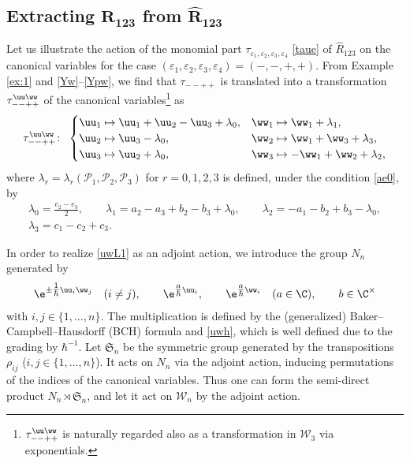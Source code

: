 \subsection[Extracting R\_123 from R\_123]{Extracting $\boldsymbol{R_{123}}$ from $\boldsymbol{\widehat{R}_{123}}$}

Let us illustrate the action of the monomial part
$\tau_{\varepsilon_1, \varepsilon_2, \varepsilon_3, \varepsilon_4}$
 \eqref{taue} of $\widehat{R}_{123}$ on the canonical variables for the case
 $(\varepsilon_1, \varepsilon_2, \varepsilon_3, \varepsilon_4) = (-,-,+,+)$.
 From Example \ref{ex:1} and \eqref{Yw}--\eqref{Ypw}, we find that
$\tau_{--++}$ is translated into a transformation $\tau^{\uu\ww}_{--++}$
of the canonical variables\footnote{$\tau^{\uu\ww}_{--++}$ is naturally regarded also as
a transformation in $\mathcal{W}_3$ via exponentials.} as
\begin{align}
\tau^{\uu\ww}_{--++}\colon\
\begin{cases}
\uu_1 \mapsto \uu_1+\uu_2-\uu_3+\lambda_0,
&
\ww_1 \mapsto \ww_1+ \lambda_1,
\\
\uu_2 \mapsto \uu_3-\lambda_0,
&
\ww_2 \mapsto \ww_1+\ww_3+\lambda_3,
\\
\uu_3 \mapsto \uu_2+\lambda_0,
&
\ww_3 \mapsto -\ww_1+\ww_2+\lambda_2,
\end{cases}
\label{uwL1}
\end{align}
where $\lambda_r=\lambda_r(\mathscr{P}_1,\mathscr{P}_2,\mathscr{P}_3)$
for $r=0, 1, 2, 3$ is defined, under the condition \eqref{ae0},
by
\begin{gather}
\lambda_0 = \frac{e_2-e_3}{2},\qquad
\lambda_1 = a_2-a_3+b_2-b_3 + \lambda_0,\qquad
\lambda_2 = -a_1-b_2+b_3-\lambda_0,\nonumber\\
\lambda_3 = c_1-c_2+c_3.\label{lad}
\end{gather}

In order to realize \eqref{uwL1} as an adjoint action, we introduce
the group $N_n$ generated by
\begin{gather*}
\e^{\pm \tfrac{1}{\hbar}\uu_i\ww_j}\quad (i \neq j),\qquad
\e^{ \tfrac{a}{\hbar}\uu_i}, \qquad \e^{ \tfrac{a}{\hbar}\ww_i}  \quad (a \in \C) ,\qquad b \in \C^\times
\end{gather*}
with $i, j\in \{1,\dotsc, n\}$. The multiplication is defined by
the (generalized) Baker--Campbell--Hausdorff (BCH) formula and
\eqref{uwh}, which is well defined due to the grading by $\hbar^{-1}$.
Let $\mathfrak{S}_n$ be the symmetric group generated by the
transpositions $\rho_{ij}$ ($i, j \in \{1,\dotsc, n\}$). It acts on
$N_n$ via the adjoint action, inducing permutations of the indices of
the canonical variables. Thus one can form the semi-direct product
$N_n \rtimes \mathfrak{S}_n$, and let it act on $\mathcal{W}_n$ by the
adjoint action.

